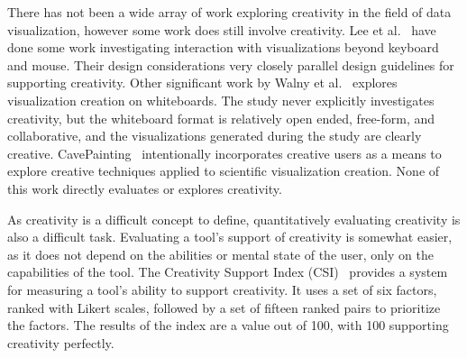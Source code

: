 \label{creativitySupport}

There has not been a wide array of work exploring creativity in the field of data visualization, however some work does still involve creativity.
Lee et al.~\cite{lee2012beyond} have done some work investigating interaction with visualizations beyond keyboard and mouse.
Their design considerations very closely parallel design guidelines for supporting creativity.
Other significant work by Walny et al.~\cite{walny2011visual} explores visualization creation on whiteboards.
The study never explicitly investigates creativity, but the whiteboard format is relatively open ended, free-form, and collaborative, and the visualizations generated during the study are clearly creative.
CavePainting~\cite{Keefe-2008-SSF} intentionally incorporates creative users as a means to explore creative techniques applied to scientific visualization creation.
None of this work directly evaluates or explores creativity.

As creativity is a difficult concept to define, quantitatively evaluating creativity is also a difficult task.
Evaluating a tool's support of creativity is somewhat easier, as it does not depend on the abilities or mental state of the user, only on the capabilities of the tool.
The Creativity Support Index (CSI)~\cite{carroll2009creativity} provides a system for measuring a tool's ability to support creativity.
It uses a set of six factors, ranked with Likert scales, followed by a set of fifteen ranked pairs to prioritize the factors.
The results of the index are a value out of 100, with 100 supporting creativity perfectly.
\bodysubsection{}
\label{}